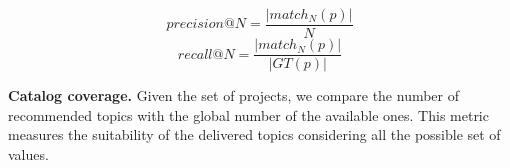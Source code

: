 

\begin{equation} \label{eqn:Precision}
precision@N = \frac{ \left | match_{N}(p) \right | }{N}
\end{equation}
\begin{equation} \label{eqn:Recall}
recall@N = \frac{ \left | match_{N}(p) \right | }{\left | GT(p) \right |}
\end{equation}

\vspace{.1cm}
\vspace{.1cm}



\noindent \textbf{Catalog coverage.} %
Given the set of projects, we compare the number of recommended topics with the global number of the available ones. %
This metric measures the suitability of the delivered topics considering all the possible set of values. %



